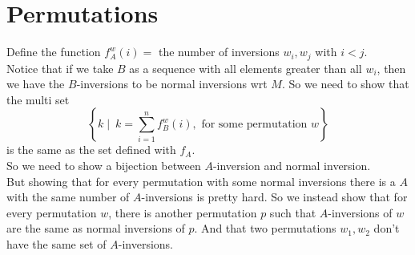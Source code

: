 \section{Permutations}


\begin{solution}
    Define the function $f^{w}_A(i)=$ the number of inversions
    $w_i, w_j$ with $i<j$.\\

    Notice that if we take $B$ as a sequence with all elements greater than
    all $w_i$, then we have the $B$-inversions to be normal inversions wrt
    $M$. So we need to show that the multi set 
    \[\left\{ k \mid \ k = \sum^{n}_{i=1} f^w_B\left(i \right), \text{ for
    some permutation } w \right\} \] 
    is the same as the set defined with $f_A$.\\

    So we need to show a bijection between $A$-inversion and normal
    inversion. \\

    But showing that for every permutation with some normal inversions there
    is a $A$ with the same number of $A$-inversions is pretty hard. So we
    instead show that for every permutation $w$, there is another permutation
    $p$ such that $A$-inversions of $w$ are the same as normal inversions of
    $p$. And that two permutations $w_1, w_2$ don't have the same set of
    $A$-inversions. 
\end{solution}

